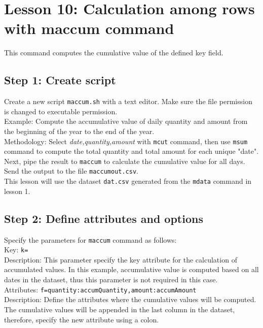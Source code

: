 

%

\section{Lesson 10: Calculation among rows with maccum command}

This command computes the cumulative value of the defined key field. 

\subsection{Step 1: Create script}

Create a new script \verb|maccum.sh| with a text editor. Make sure the file permission is changed to executable permission. \\

Example:  Compute the accumulative value of daily quantity and amount from the beginning of the year to the end of the year. \\ 

Methodology: Select  \emph{date,quantity,amount} with \verb|mcut| command, then use \verb|msum| command to compute the total quantity and total amount for each unique "date". Next, pipe the result to \verb|maccum| to calculate the cumulative value for all days. Send the output to the file \verb|maccumout.csv|. \\

This lesson will use the dataset \verb|dat.csv| generated from the \verb|mdata| command in lesson 1. 

\subsection{Step 2: Define attributes and options }

{\setlength{\parindent}{0cm}

Specify the parameters for \verb|maccum| command as follows: \\

Key: 			\verb|k=| \\
Description: 	This parameter specify the key attribute for the calculation of accumulated values. In this example, accumulative value is computed based on all dates in the dataset, thus this parameter is not required in this case. \\

Attributes: 	\verb|f=quantity:accumQuantity,amount:accumAmount| \\
Description: 	Define the attributes where the cumulative values will be computed. The cumulative values will be appended in the last column in the dataset, therefore, specify the new attribute using a colon. \\
}

